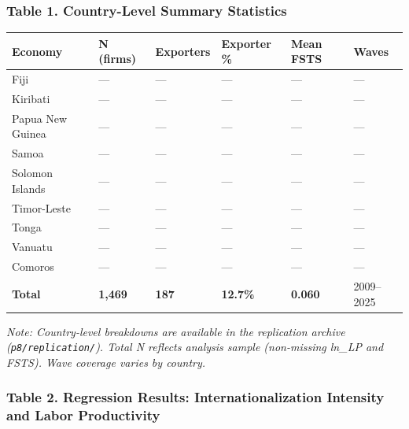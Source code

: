\documentclass[12pt,a4paper]{article}
\begin{document}
\hypertarget{table-1-country-level-summary-statistics}{%
\subsubsection{Table 1. Country-Level Summary
Statistics}\label{table-1-country-level-summary-statistics}}

\begin{longtable}[]{@{}llllll@{}}
\toprule\noalign{}
Economy & N (firms) & Exporters & Exporter \% & Mean FSTS & Waves \\
\midrule\noalign{}
\endhead
\bottomrule\noalign{}
\endlastfoot
Fiji & --- & --- & --- & --- & --- \\
Kiribati & --- & --- & --- & --- & --- \\
Papua New Guinea & --- & --- & --- & --- & --- \\
Samoa & --- & --- & --- & --- & --- \\
Solomon Islands & --- & --- & --- & --- & --- \\
Timor-Leste & --- & --- & --- & --- & --- \\
Tonga & --- & --- & --- & --- & --- \\
Vanuatu & --- & --- & --- & --- & --- \\
Comoros & --- & --- & --- & --- & --- \\
\textbf{Total} & \textbf{1,469} & \textbf{187} & \textbf{12.7\%} &
\textbf{0.060} & 2009--2025 \\
\end{longtable}

\emph{Note: Country-level breakdowns are available in the replication
archive (\texttt{p8/replication/}). Total N reflects analysis sample
(non-missing ln\_LP and FSTS). Wave coverage varies by country.}

\hypertarget{table-2-regression-results-internationalization-intensity-and-labor-productivity}{%
\subsubsection{Table 2. Regression Results: Internationalization
Intensity and Labor
Productivity}\label{table-2-regression-results-internationalization-intensity-and-labor-productivity}}
\end{document}
